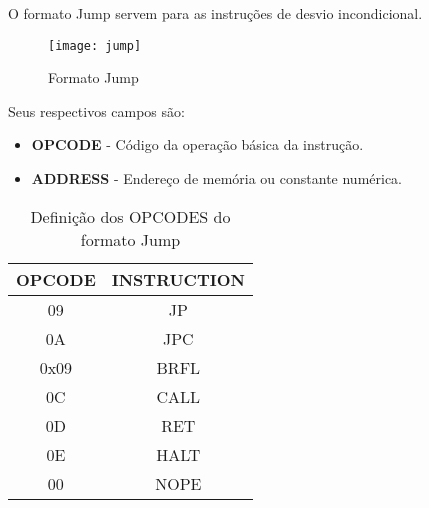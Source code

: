  O formato Jump servem para as instruções de desvio incondicional.  	
   	\begin{figure}[H]
    	\centering
    	\texttt{[image: jump]}
    	\caption{Formato Jump}
		\label{jump}
  	\end{figure}
Seus respectivos campos são:
	\begin{itemize}
	\item \textbf{OPCODE} - Código da operação básica da instrução.
	\item \textbf{ADDRESS} - Endereço de memória ou constante numérica.
\end{itemize}
 
\begin{table}[H]
\centering 	
  	\begin{tabular}{|c|c|}
  	\hline 
  	\cellcolor[gray]{0.9}\textbf{OPCODE} & \cellcolor[gray]{0.9}\textbf{INSTRUCTION} \\ 
  	\hline 
  	09 & JP \\ 
  	\hline 
  	0A & JPC \\ 
  	\hline 
  	0x09 & BRFL \\ 
  	\hline 
  	0C & CALL \\ 
  	\hline 
  	0D & RET \\ 
  	\hline 
  	0E & HALT \\ 
  	\hline 
  	00 & NOPE \\ 
  	\hline 
  	\end{tabular} 
  	  	\caption{Definição dos OPCODES do formato Jump}
\end{table}
